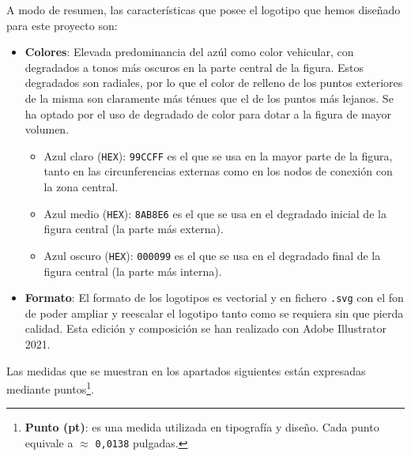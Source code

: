 \documentclass[../ei103948-project-documentation.tex]{subfiles}
\begin{document}
                            \newpage
                    
                            A modo de resumen, las características que posee el logotipo que hemos diseñado para este proyecto son:
                                \begin{itemize}
                                    \item \textbf{Colores}: Elevada predominancia del azúl como color vehicular, con degradados a tonos más oscuros en la parte central de la figura. Estos degradados son radiales, por lo que el color de relleno de los puntos exteriores de la misma son claramente más ténues que el de los puntos más lejanos. Se ha optado por el uso de degradado de color para dotar a la figura de mayor volumen.
                                        \begin{itemize}
                                            \item Azul claro (\texttt{HEX}): \texttt{99CCFF} es el que se usa en la mayor parte de la figura, tanto en las circunferencias externas como en los nodos de conexión con la zona central.
                                            \item Azul medio (\texttt{HEX}): \texttt{8AB8E6} es el que se usa en el degradado inicial de la figura central (la parte más externa).
                                            \item Azul oscuro (\texttt{HEX}): \texttt{000099} es el que se usa en el degradado final de la figura central (la parte más interna).
                                        \end{itemize}
                                    \item \textbf{Formato}: El formato de los logotipos es vectorial y en fichero \texttt{.svg} con el fon de poder ampliar y reescalar el logotipo tanto como se requiera sin que pierda calidad. Esta edición y composición se han realizado con Adobe Illustrator 2021.
                                \end{itemize}
                            
                                Las medidas que se muestran en los apartados siguientes están expresadas mediante puntos\footnote{\textbf{Punto (pt)}: es una medida utilizada en tipografía y diseño. Cada punto equivale a $\approx$ \texttt{0,0138} pulgadas.}.
                    
                                \newpage
                            
\end{document}
